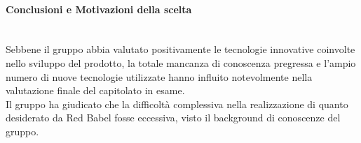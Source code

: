 \paragraph{Conclusioni e Motivazioni della scelta}\-\\
Sebbene il gruppo abbia valutato positivamente le tecnologie innovative coinvolte nello sviluppo del prodotto, la totale mancanza di conoscenza pregressa e l'ampio numero di nuove tecnologie utilizzate hanno influito notevolmente nella valutazione finale del capitolato in esame. \\
Il gruppo ha giudicato che la difficoltà complessiva nella realizzazione di quanto desiderato da Red Babel fosse eccessiva, visto il background di conoscenze del gruppo.
